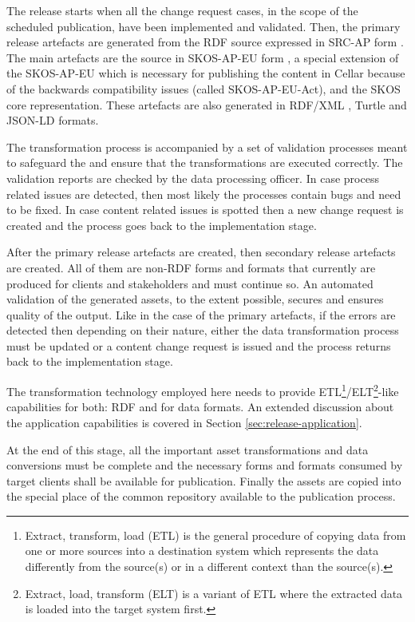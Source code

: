 	The release starts when all the change request cases, in the scope of the scheduled publication, have been implemented and validated. Then, the primary release artefacts are generated from the RDF source expressed in SRC-AP form \citep{src-ap-vb3}. The main artefacts are the source in SKOS-AP-EU form \citep{skos-ap-eu}, a special extension of the SKOS-AP-EU which is necessary for publishing the content in Cellar because of the backwards compatibility issues (called SKOS-AP-EU-Act), and the SKOS core \citep{skos-spec} representation. These artefacts are also generated in RDF/XML \citep{rdf-xml-Schreiber:14:RXS,rdf-xml-Beckett:04:RSS}, Turtle \citep{turtle-Carothers:14:RT} and JSON-LD \citep{sporny2014json,spornyjson} formats. 
	
	The transformation process is accompanied by a set of validation processes meant to safeguard the and ensure that the transformations are executed correctly. The validation reports are checked by the data processing officer. In case process related issues are detected, then most likely the processes contain bugs and need to be fixed. In case content related issues is spotted then a new change request is created and the process goes back to the implementation stage. 
	
	After the primary release artefacts are created, then secondary release artefacts are created. All of them are non-RDF forms and formats that currently are produced for clients and stakeholders and must continue so. An automated validation of the generated assets, to the extent possible, secures and ensures quality of the output. Like in the case of the primary artefacts, if the errors are detected then depending on their nature, either the data transformation process must be updated or a content change request is issued and the process returns back to the implementation stage. 
	
	The transformation technology employed here needs to provide ETL\footnote{Extract, transform, load (ETL) is the general procedure of copying data from one or more sources into a destination system which represents the data differently from the source(s) or in a different context than the source(s).}/ELT\footnote{Extract, load, transform (ELT) is a variant of ETL where the extracted data is loaded into the target system first.}-like capabilities for both: RDF and for data formats. An extended discussion about the application capabilities is covered in Section \ref{sec:release-application}.
	
	At the end of this stage, all the important asset transformations and data conversions must be complete and the necessary forms and formats consumed by target clients shall be available for publication. Finally the assets are copied into the special place of the common repository available to the publication process. 
	
